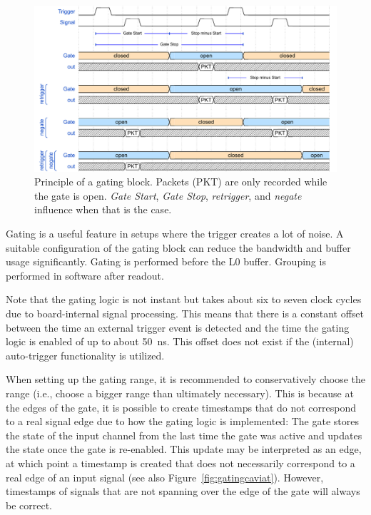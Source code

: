 {    \begin{figure}[bth]
        \centering
        \includegraphics[width=1.0\linewidth]{figures/gating_principle.pdf}
        \caption{Principle of a gating block.
            Packets (PKT) are only recorded
            while the gate is open.
            \emph{Gate Start}, \emph{Gate Stop},
            \emph{retrigger}, and \emph{negate} influence when that is the 
            case.}
        \label{fig:gatingprinciple}
    \end{figure}
    
    Gating is a useful feature in setups where the trigger creates a lot of
    noise.  A suitable configuration of the gating block can reduce the
    bandwidth and buffer usage significantly.  Gating is performed before the
    L0 buffer. Grouping is performed in software after readout. 

    Note that the gating logic is not instant but takes about six to seven
    clock cycles due to board-internal signal processing. 
    This means that there is a constant offset between the time an
    external trigger event is detected and the time the gating logic is
    enabled of up to about 50~ns.
    This offset does not exist if the (internal) auto-trigger functionality
    is utilized.

    When setting up the gating range, it is recommended to conservatively 
    choose the range (i.e., choose a bigger range than ultimately necessary).
    This is because at the edges of the gate, it is possible
    to create timestamps that do not correspond to a real signal edge
    due to how the gating logic is implemented: 
    The gate stores the state of the input channel from the last time the
    gate was active and updates the state once the gate is re-enabled. This
    update may be interpreted as an edge, at which point a timestamp is
    created that does not necessarily correspond to a real edge of an input
    signal (see also Figure~\ref{fig:gatingcaviat}).
    However, timestamps of signals that are not spanning over the edge of the 
    gate will always be correct.

}

